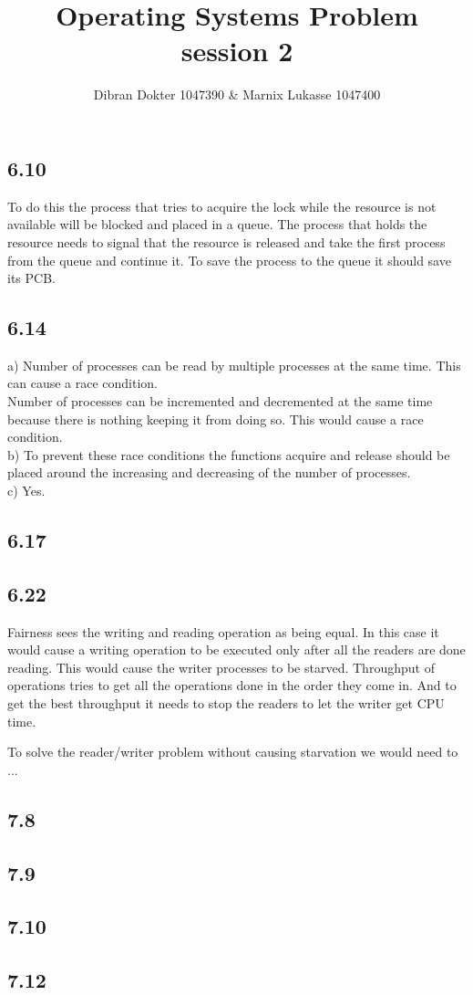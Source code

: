 \documentclass[]{article}
\title{Operating Systems Problem session 2}
\author{Dibran Dokter 1047390 \& Marnix Lukasse 1047400}
\begin{document}
\maketitle

\subsection*{6.10}

To do this the process that tries to acquire the lock while the resource is not available will be blocked and placed in a queue. The process that holds the resource needs to signal that the resource is released and take the first process from the queue and continue it. To save the process to the queue it should save its PCB.

\subsection*{6.14}

a)
Number of processes can be read by multiple processes at the same time. This can cause a race condition.\\
Number of processes can be incremented and decremented at the same time because there is nothing keeping it from doing so. This would cause a race condition.\\

b)
To prevent these race conditions the functions acquire and release should be placed around the increasing and decreasing of the number of processes.\\

c)
Yes.

\subsection*{6.17}



\subsection*{6.22}

Fairness sees the writing and reading operation as being equal. In this case it would cause a writing operation to be executed only after all the readers are done reading. This would cause the writer processes to be starved.
Throughput of operations tries to get all the operations done in the order they come in. And to get the best throughput it needs to stop the readers to let the writer get CPU time.

To solve the reader/writer problem without causing starvation we would need to ...

\subsection*{7.8}

\subsection*{7.9}

\subsection*{7.10}

\subsection*{7.12}
\end{document}
